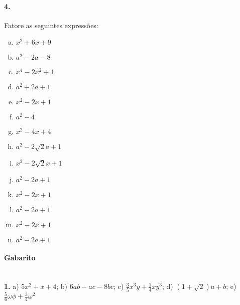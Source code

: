\documentclass[a4paper,12pt]{article}
\begin{document}
\begin{multicols}{2}
\paragraph{4.} Fatore as seguintes expressões:
\begin{enumerate}[a)]
\item $x^2 + 6x + 9$
\item $a^2 - 2a - 8$
\item $x^4 - 2x^2 + 1$
\item $a^2 + 2a + 1$
\item $x^2 - 2x + 1$
\item $a^2 - 4$
\item $x^2 - 4x + 4$
\item $a^2 - 2\sqrt{2}a + 1$
\item $x^2 - 2\sqrt{2}x + 1$
\item $a^2 - 2a + 1$
\item $x^2 - 2x + 1$
\item $a^2 - 2a + 1$
\item $x^2 - 2x + 1$
\item $a^2 - 2a + 1$ 
\end{enumerate}
\end{multicols}
 
\vspace*{\fill}
{\footnotesize
\paragraph*{Gabarito} \hspace*{\fill}\\
\textbf{1.} a) $5x^2 + x + 4$; b) $6ab - ac - 8bc$; c) $\frac{3}{5}x^3y + \frac{1}{4}xy^3$; d) $(1 + \sqrt{2})a + b$; e) $\frac{5}{6}\omega\phi +\frac{3}{4}\omega^2 $\\
}
\end{document}
